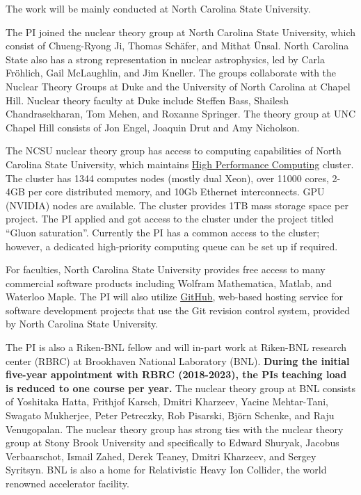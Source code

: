 \documentclass{DOEproposal}
\begin{document}
		The work will be mainly conducted at North Carolina State University. 


		The PI joined 
		the nuclear theory group at North Carolina State University, which consist
		of Chueng-Ryong Ji, Thomas Sch\"afer, and Mithat \"Unsal. 
		North Carolina State also has a strong representation in	
		nuclear astrophysics, led by Carla Fr\"ohlich, Gail McLaughlin,
		and Jim Kneller. 
		The groups collaborate with the Nuclear Theory Groups 
		at Duke  and the University of North
		Carolina at Chapel Hill. 
		Nuclear theory faculty at Duke include Steffen Bass, 
		Shailesh Chandrasekharan, Tom Mehen, and Roxanne Springer. 
		The theory group at UNC Chapel Hill consists of Jon Engel, Joaquin Drut and Amy Nicholson.
		
		The  NCSU nuclear theory group has access to computing capabilities of  
		North Carolina State University, which   
		maintains \href{https://projects.ncsu.edu/hpc//main.php}{High Performance Computing} 
		cluster. The cluster has 1344 computes nodes (mostly dual Xeon), 
		over 11000 cores, 2-4GB per core distributed memory, and 10Gb Ethernet interconnects.
		GPU (NVIDIA) nodes are available. 
		The cluster provides 1TB mass storage space per project. 
		The PI applied and got access to the cluster under the project titled  
		``Gluon saturation''. 
		Currently the PI has a common access 
		to the cluster; however, a dedicated high-priority computing queue can be set up 
		if required. 
		
		For faculties, North Carolina State University provides free access to 
		many commercial software products including Wolfram Mathematica, Matlab, and
		Waterloo Maple.  The PI will also utilize \href{https://github.ncsu.edu}{GitHub}, 
		web-based hosting service 
		for software development projects that use the Git revision control system, 
		provided by North Carolina State University.  


		The PI is also a Riken-BNL fellow and will in-part work  at 
		Riken-BNL research center (RBRC) at Brookhaven National Laboratory (BNL).
		{\bf During the initial five-year appointment with RBRC 
		(2018-2023), the PIs teaching load is reduced to one course per year. }   
		The nuclear theory group at BNL consists of 
		Yoshitaka Hatta,
		Frithjof Karsch,
		Dmitri Kharzeev,
		Yacine Mehtar-Tani,
		Swagato Mukherjee,
		Peter Petreczky,
		Rob Pisarski,
		Bj\"orn Schenke,
		and Raju Venugopalan. 
		The nuclear theory group has strong ties with the nuclear theory group 
		at Stony Brook University and specifically to 
		Edward Shuryak, Jacobus Verbaarschot, Ismail Zahed,  Derek Teaney,
		Dmitri Kharzeev, and  Sergey Syritsyn. 
		BNL is also a home for Relativistic Heavy Ion Collider, the world renowned 
		accelerator facility.    
\end{document}
